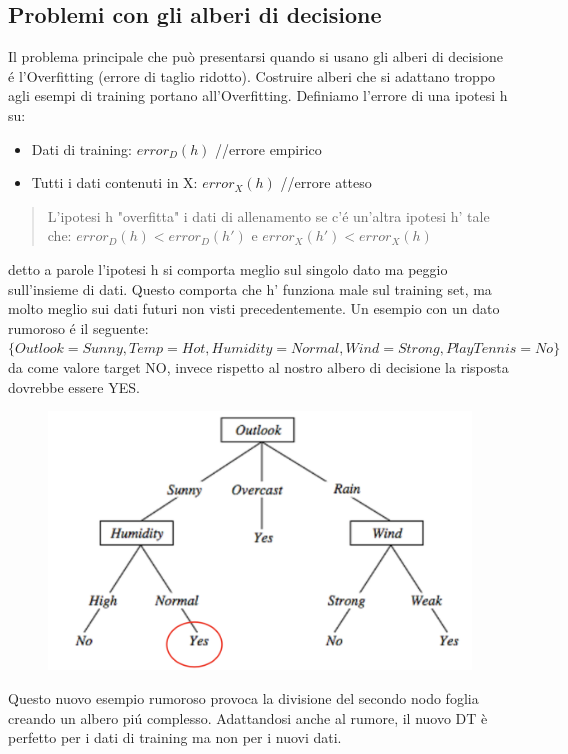 \documentclass{article}
\begin{document}
\subsection{Problemi con gli alberi di decisione}
Il problema principale che può presentarsi quando si usano gli alberi di decisione é l'Overfitting (errore di taglio ridotto). Costruire alberi che si adattano troppo agli esempi di training portano all'Overfitting. Definiamo l'errore di una ipotesi h su:
\begin{itemize}
    \item Dati di training: $error_D(h)$ //errore empirico
    \item Tutti i dati contenuti in X: $error_X(h)$ //errore atteso
\end{itemize}
\begin{quote}
    L'ipotesi h "overfitta" i dati di allenamento se c'é un'altra ipotesi h' tale che: \newline
    $error_D(h)<error_D(h')$ e $error_X(h') < error_X(h)$
\end{quote}
detto a parole l'ipotesi h si comporta meglio sul singolo dato ma peggio sull'insieme di dati. Questo comporta che h' funziona male sul training set, ma molto meglio sui dati futuri non visti precedentemente. \newline
Un esempio con un dato rumoroso é il seguente: $\{Outlook=Sunny, Temp=Hot, Humidity=Normal, Wind=Strong, PlayTennis=No\}$ da come valore target NO, invece rispetto al nostro albero di decisione la risposta dovrebbe essere YES. 
\begin{figure}[H]
\centering
\includegraphics[scale=0.5]{Images/noisydataexampl.png}
\end{figure}
Questo nuovo esempio rumoroso provoca la divisione del secondo nodo foglia creando un albero piú complesso. Adattandosi anche al rumore, il nuovo DT è perfetto per i dati di training ma non per i nuovi dati.
\end{document}
